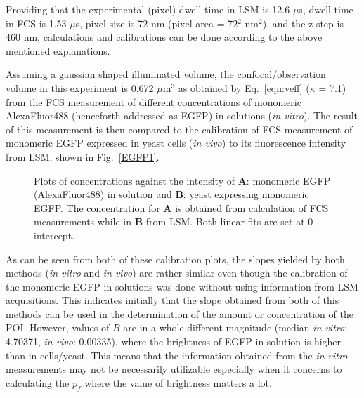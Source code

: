 Providing that the experimental (pixel) dwell time in LSM is 12.6 $\mu$s, dwell time in FCS is 1.53 $\mu$s, pixel size is 72 nm (pixel area = 72$^{2}$ nm$^{2}$), and the z-step is 460 nm, calculations and calibrations can be done according to the above mentioned explanations.

Assuming a gaussian shaped illuminated volume, the confocal/observation volume in this experiment is 0.672 $\mu$m$^{3}$ as obtained by Eq.~\ref{eqn:veff} ($\kappa$ = 7.1) from the FCS measurement of different concentrations of monomeric AlexaFluor488 (henceforth addressed as EGFP) in solutions (\textit{in vitro}). 
The result of this measurement is then compared to the calibration of FCS measurement of monomeric EGFP expressed in yeast cells (\textit{in vivo}) to its fluorescence intensity from LSM, shown in Fig.~\ref{EGFP1}.  

\begin{figure}[!h]
\centering
{}\hfil
{}
\caption{Plots of concentrations against the intensity of \textbf{A}: monomeric EGFP (AlexaFluor488) in solution and \textbf{B}: yeast expressing monomeric EGFP. The concentration for \textbf{A} is obtained from calculation of FCS measurements while in \textbf{B} from LSM. 
Both linear fits are set at 0 intercept.}
\label{fig:monogfp}
\end{figure}

As can be seen from both of these calibration plots, the slopes yielded by both methods (\textit{in vitro} and \textit{in vivo}) are rather similar even though the calibration of the monomeric EGFP in solutions was done without using information from LSM acquisitions. 
This indicates initially that the slope obtained from both of this methods can be used in the determination of the amount or concentration of the POI. However, values of $B$ are in a whole different magnitude (median \textit{in vitro}: 4.70371, \textit{in vivo}: 0.00335), where the brightness of EGFP in solution is higher than in cells/yeast. 
This means that the information obtained from the \textit{in vitro} measurements may not be necessarily utilizable especially when it concerns to calculating the $p_{f}$ where the value of brightness matters a lot.

